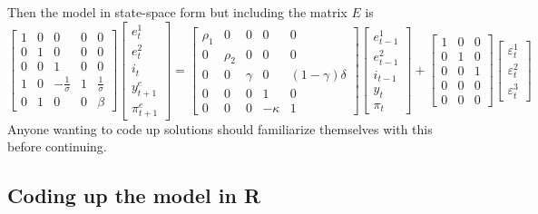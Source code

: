\documentclass[
  letterpaper,
]{book}
\begin{document}
Then the model in state-space form but including the matrix \(E\) is \[
\begin{bmatrix} 1 & 0 & 0 & 0 & 0 \\ 
                0 & 1 & 0 & 0 & 0 \\ 
                0 & 0 & 1 & 0 & 0 \\ 
                1 & 0 & -\frac{1}{\sigma} & 1 & \frac{1}{\sigma} \\ 
                0 & 1 & 0 & 0 & \beta
\end{bmatrix}
\begin{bmatrix} e^1_t \\ e^2_t \\ i_t \\ y^e_{t+1} \\ \pi^e_{t+1} \end{bmatrix} 
   = 
   \begin{bmatrix} \rho_1 & 0 & 0 & 0 & 0 \\ 
                0 & \rho_2 & 0 & 0 & 0 \\ 
                0 & 0 & \gamma & 0 & (1-\gamma)\delta \\ 
                0 & 0 & 0 & 1 & 0 \\ 
                0 & 0 & 0 & -\kappa & 1
   \end{bmatrix}
\begin{bmatrix} e^1_{t-1} \\ e^2_{t-1} \\ i_{t-1} \\ y_t \\ \pi_t \end{bmatrix}    
   + 
      \begin{bmatrix} 
                1 & 0 & 0  \\ 
                0 & 1 & 0 \\ 
                0 & 0 & 1 \\ 
                0 & 0 & 0 \\ 
                0 & 0 & 0 
   \end{bmatrix}
   \begin{bmatrix} \varepsilon^1_t \\ \varepsilon^2_t \\ \varepsilon^3_t \end{bmatrix}    
\] Anyone wanting to code up solutions should familiarize themselves
with this before continuing.

\hypertarget{coding-up-the-model-in-r}{%
\subsection{Coding up the model in R}\label{coding-up-the-model-in-r}}
\end{document}
